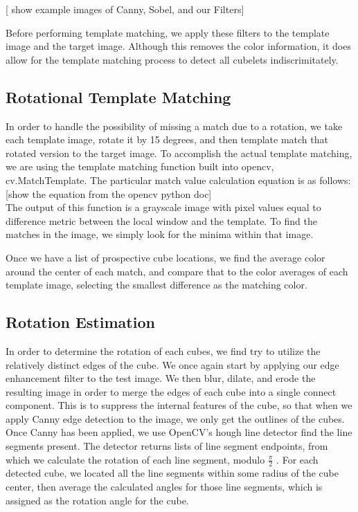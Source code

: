 \documentclass[conference]{IEEEtran}
\begin{document}
[ show example images of Canny, Sobel, and our Filters]

Before performing template matching, we apply these filters to the template image and the target image.  Although this removes the  color information, it does allow for the template matching process to detect all cubelets indiscrimitately. 

\subsection{Rotational Template Matching}
In order to handle the possibility of missing a match due to a rotation, we take each template image, rotate it by 15 degrees, and then template match that rotated version to the target image.  To accomplish the actual template matching, we are using the template matching function built into opencv, cv.MatchTemplate. The particular match value calculation equation is as follows: 
\\[6pt]
[show the equation from the opencv python doc]
\\[6pt]
The output of this function is a grayscale image with pixel values equal to difference metric between the local window and the template.  To find the matches in the image, we simply look for the minima within that image.

Once we have a list of prospective cube locations, we find the average color around the center of each match, and compare that to the color averages of each template image, selecting the smallest difference as the matching color.

\subsection{Rotation Estimation}
In order to determine the rotation of each cubes, we find try to utilize the relatively distinct edges of the cube.  We once again start by applying our edge enhancement filter to the test image.  We then blur, dilate, and erode the resulting image in order to merge the edges of each cube into a single connect component.  This is to suppress the internal features of the cube, so that when we apply Canny edge detection to the image, we only get the outlines of the cubes.  Once Canny has been applied, we use OpenCV's hough line detector find the line segments present.  The detector returns lists of line segment endpoints, from which we calculate the rotation of each line segment, modulo $ \frac{\pi}{2}$ .  For each detected cube, we located all the line segments within some radius of the cube center, then average the calculated angles for those line segments, which is assigned as the rotation angle for the cube.
\end{document}
